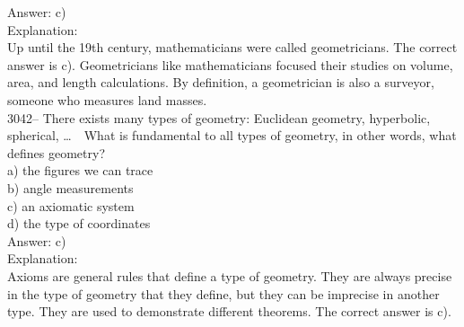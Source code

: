\documentclass[letterpaper, 12pt]{article}
\begin{document}
Answer: c)\\

Explanation:\\
Up until the 19th century, mathematicians were called geometricians. The correct answer is c). Geometricians like mathematicians focused their studies on volume, area, and length calculations. By definition, a geometrician is also a surveyor, someone who measures land masses.\\



3042-- There exists many types of geometry: Euclidean geometry, hyperbolic, spherical, \dots \ \ What is fundamental to all types of geometry, in other words, what defines geometry?\\

a) the figures we can trace\\
b) angle measurements\\
c) an axiomatic system\\
d) the type of coordinates\\

Answer: c)\\

Explanation:\\
Axioms are general rules that define a type of geometry. They are always precise in the type of geometry that they define, but they can be imprecise in another type. They are used to demonstrate different theorems. The correct answer is c).\\
\end{document}
